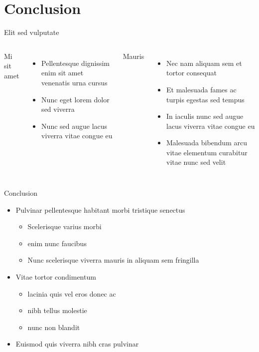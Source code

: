 \section{Conclusion}

\begin{frame}{Elit sed vulputate}
    \begin{columns}
        Mi sit amet
            \begin{itemize}
                \item Pellentesque dignissim enim sit amet venenatis urna cursus
                \item Nunc eget lorem dolor sed viverra\cite{rae_miles2km_2023}
                \item Nunc sed augue lacus viverra vitae congue eu
            \end{itemize}
        Mauris\cite{yoo_undergrad_2023}
        \begin{itemize}
            \item Nec nam aliquam sem et tortor consequat
            \item Et malesuada fames ac turpis egestas sed tempus
            \item In iaculis nunc sed augue lacus viverra vitae congue eu
            \item Malesuada bibendum arcu vitae elementum curabitur vitae nunc sed velit
        \end{itemize}
    \end{columns}   
\end{frame}

\begin{frame}{Conclusion}
    \begin{itemize}
        \item Pulvinar pellentesque habitant morbi tristique senectus
        \begin{itemize}
            \item Scelerisque varius morbi\cite{evans_recognizing_2016}
            \item enim nunc faucibus\cite{hand_making_2022}
            \item Nunc scelerisque viverra mauris in aliquam sem fringilla
        \end{itemize}
        \bigskip
        \item Vitae tortor condimentum
        \begin{itemize}
            \item lacinia quis vel eros donec ac
            \item nibh tellus molestie
            \item nunc non blandit\cite{koppel_skiing_2022}
        \end{itemize}
        \bigskip
        \item Euismod quis viverra nibh cras pulvinar
    \end{itemize}
\end{frame}